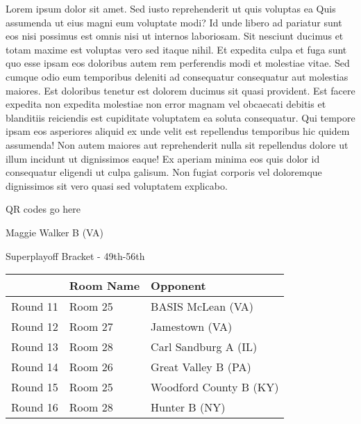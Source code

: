 \documentclass{article}%
\begin{document}
\vspace*{8pt}%
\linebreak%
\newline%
\newline%
    Lorem ipsum dolor sit amet. Sed iusto reprehenderit ut quis voluptas ea Quis assumenda ut eius magni eum voluptate modi? Id unde libero ad pariatur sunt eos nisi possimus est omnis nisi ut internos laboriosam. Sit nesciunt ducimus et totam maxime est voluptas vero sed itaque nihil. Et expedita culpa et fuga sunt quo esse ipsam eos doloribus autem rem perferendis modi et molestiae vitae.\newline%
\newline%
    Sed cumque odio eum temporibus deleniti ad consequatur consequatur aut molestias maiores. Est doloribus tenetur est dolorem ducimus sit quasi provident. Est facere expedita non expedita molestiae non error magnam vel obcaecati debitis et blanditiis reiciendis est cupiditate voluptatem ea soluta consequatur. Qui tempore ipsam eos asperiores aliquid ex unde velit est repellendus temporibus hic quidem assumenda!\newline%
\newline%
    Non autem maiores aut reprehenderit nulla sit repellendus dolore ut illum incidunt ut dignissimos eaque! Ex aperiam minima eos quis dolor id consequatur eligendi ut culpa galisum. Non fugiat corporis vel doloremque dignissimos sit vero quasi sed voluptatem explicabo.\newline%
\newline%
\vspace*{30pt}%
\begin{center}%
\begin{Huge}%
QR codes go here%
\end{Huge}%
\end{center}%
\newpage%
\begin{center}%
\begin{Huge}%
Maggie Walker B (VA)%
\end{Huge}%
\vspace*{8pt}%
\linebreak%
\begin{Large}%
Superplayoff Bracket {-} 49th{-}56th%
\end{Large}%
\end{center}%
%
\begin{tabularx}{\textwidth}{|c|Y|Y|}%
\hline%
&Room Name&Opponent\\%
\hline%
Round 11&Room 25&BASIS McLean (VA)\\%
Round 12&Room 27&Jamestown (VA)\\%
Round 13&Room 28&Carl Sandburg A (IL)\\%
Round 14&Room 26&Great Valley B (PA)\\%
Round 15&Room 25&Woodford County B (KY)\\%
Round 16&Room 28&Hunter B (NY)\\%
\hline%
\end{tabularx}%
\end{document}
